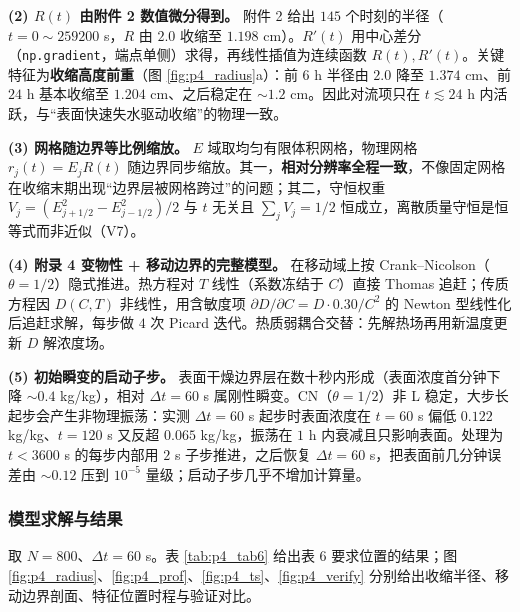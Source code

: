 \textbf{(2) $R(t)$ 由附件 2 数值微分得到。} 附件 2 给出 $145$ 个时刻的半径（$t=0\sim259200$ s，$R$ 由 $2.0$ 收缩至 $1.198$ cm）。$R'(t)$ 用中心差分（\texttt{np.gradient}，端点单侧）求得，再线性插值为连续函数 $R(t),R'(t)$。关键特征为\textbf{收缩高度前重}（图 \ref{fig:p4_radius}a）：前 $6$ h 半径由 $2.0$ 降至 $1.374$ cm、前 $24$ h 基本收缩至 $1.204$ cm、之后稳定在 $\sim1.2$ cm。因此对流项只在 $t\lesssim24$ h 内活跃，与“表面快速失水驱动收缩”的物理一致。

\textbf{(3) 网格随边界等比例缩放。} $E$ 域取均匀有限体积网格，物理网格 $r_j(t)=E_jR(t)$ 随边界同步缩放。其一，\textbf{相对分辨率全程一致}，不像固定网格在收缩末期出现“边界层被网格跨过”的问题；其二，守恒权重 $V_j=(E_{j+1/2}^2-E_{j-1/2}^2)/2$ 与 $t$ 无关且 $\sum_jV_j=1/2$ 恒成立，离散质量守恒是恒等式而非近似（V7）。

\textbf{(4) 附录 4 变物性 + 移动边界的完整模型。} 在移动域上按 Crank--Nicolson（$\theta=1/2$）隐式推进。热方程对 $T$ 线性（系数冻结于 $C$）直接 Thomas 追赶；传质方程因 $D(C,T)$ 非线性，用含敏度项 $\partial D/\partial C=D\cdot0.30/C^2$ 的 Newton 型线性化后追赶求解，每步做 $4$ 次 Picard 迭代。热质弱耦合交替：先解热场再用新温度更新 $D$ 解浓度场。

\textbf{(5) 初始瞬变的启动子步。} 表面干燥边界层在数十秒内形成（表面浓度首分钟下降 $\sim0.4$ kg/kg），相对 $\Delta t=60$ s 属刚性瞬变。CN（$\theta=1/2$）非 L 稳定，大步长起步会产生非物理振荡：实测 $\Delta t=60$ s 起步时表面浓度在 $t=60$ s 偏低 $0.122$ kg/kg、$t=120$ s 又反超 $0.065$ kg/kg，振荡在 $1$ h 内衰减且只影响表面。处理为 $t<3600$ s 的每步内部用 $2$ s 子步推进，之后恢复 $\Delta t=60$ s，把表面前几分钟误差由 $\sim0.12$ 压到 $10^{-5}$ 量级；启动子步几乎不增加计算量。

\subsubsection{模型求解与结果}

取 $N=800$、$\Delta t=60$ s。表 \ref{tab:p4_tab6} 给出表 6 要求位置的结果；图 \ref{fig:p4_radius}、\ref{fig:p4_prof}、\ref{fig:p4_ts}、\ref{fig:p4_verify} 分别给出收缩半径、移动边界剖面、特征位置时程与验证对比。

